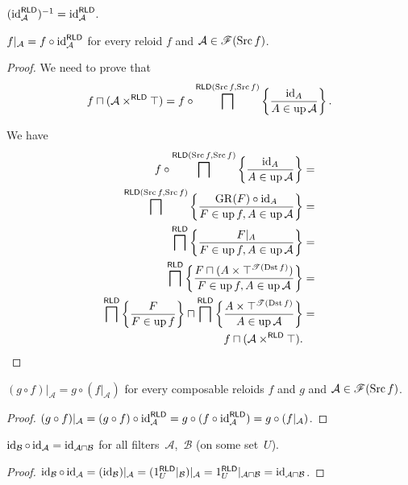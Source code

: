 \begin{cor}
$(\operatorname{id}_{\mathcal{A}}^{\mathsf{RLD}})^{-1}=\operatorname{id}_{\mathcal{A}}^{\mathsf{RLD}}$.\end{cor}
\begin{thm}
$f|_{\mathcal{A}}=f\circ\operatorname{id}_{\mathcal{A}}^{\mathsf{RLD}}$ for every
reloid $f$ and $\mathcal{A}\in\mathscr{F}(\operatorname{Src} f)$.\end{thm}
\begin{proof}
We need to prove that 
\[
f\sqcap(\mathcal{A}\times^{\mathsf{RLD}}\top)=f\circ\bigsqcap^{\mathsf{RLD}(\operatorname{Src} f,\operatorname{Src} f)}\left\{ \frac{\operatorname{id}_{A}}{A\in\operatorname{up}\mathcal{A}}\right\}.
\]


We have
\begin{align*}
f\circ\bigsqcap^{\mathsf{RLD}(\operatorname{Src} f,\operatorname{Src} f)}\left\{ \frac{\operatorname{id}_{A}}{A\in\operatorname{up}\mathcal{A}}\right\} & =\\
\bigsqcap^{\mathsf{RLD}(\operatorname{Src} f,\operatorname{Src} f)}\left\{ \frac{\operatorname{GR}(F)\circ\operatorname{id}_{A}}{F\in\operatorname{up} f,A\in\operatorname{up}\mathcal{A}}\right\} & =\\
\bigsqcap^{\mathsf{RLD}}\left\{ \frac{F|_{A}}{F\in\operatorname{up} f,A\in\operatorname{up}\mathcal{A}}\right\} & =\\
\bigsqcap^{\mathsf{RLD}}\left\{ \frac{F\sqcap(A\times\top^{\mathscr{T}(\operatorname{Dst} f)})}{F\in\operatorname{up} f,A\in\operatorname{up}\mathcal{A}}\right\} & =\\
\bigsqcap^{\mathsf{RLD}}\left\{ \frac{F}{F\in\operatorname{up} f}\right\}\sqcap\bigsqcap^{\mathsf{RLD}}\left\{ \frac{A\times\top^{\mathscr{T}(\operatorname{Dst} f)}}{A\in\operatorname{up}\mathcal{A}}\right\} & =\\
f\sqcap(\mathcal{A}\times^{\mathsf{RLD}}\top).
\end{align*}
\end{proof}
\begin{thm}
$(g\circ f)|_{\mathcal{A}}=g\circ(f|_{\mathcal{A}})$ for every composable
reloids $f$ and $g$ and $\mathcal{A}\in\mathscr{F}(\operatorname{Src} f)$.\end{thm}
\begin{proof}
$(g\circ f)|_{\mathcal{A}}=(g\circ f)\circ\operatorname{id}_{\mathcal{A}}^{\mathsf{\mathsf{RLD}}}=g\circ(f\circ\operatorname{id}_{\mathcal{A}}^{\mathsf{\mathsf{RLD}}})=g\circ(f|_{\mathcal{A}})$.\end{proof}

\begin{prop}\label{rld-id-comp}
$\operatorname{id}_{\mathcal{B}}\circ\operatorname{id}_{\mathcal{A}} = \operatorname{id}_{\mathcal{A}\sqcap\mathcal{B}}$ for all filters~$\mathcal{A}$,~$\mathcal{B}$ (on some set~$U$).
\end{prop}

\begin{proof}
$\operatorname{id}_{\mathcal{B}}\circ\operatorname{id}_{\mathcal{A}} =
(\operatorname{id}_{\mathcal{B}})|_{\mathcal{A}} = (1^{\mathsf{RLD}}_U|_{\mathcal{B}})|_{\mathcal{A}} = 1^{\mathsf{RLD}}_U|_{\mathcal{A}\sqcap\mathcal{B}} = 
\operatorname{id}_{\mathcal{A}\sqcap\mathcal{B}}$.
\end{proof}

